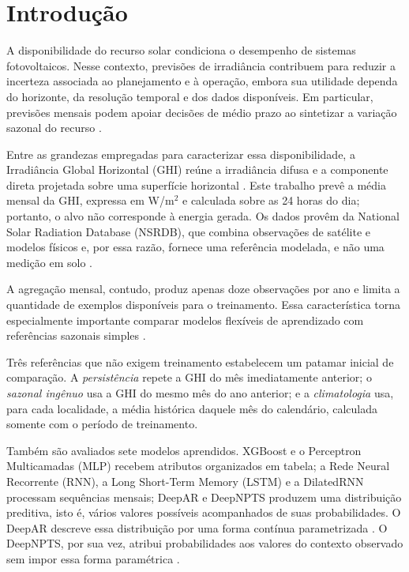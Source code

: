 \documentclass[12pt,a4paper,fleqn]{article}
\begin{document}
\section{Introdução}
\label{sec:introducao}

A disponibilidade do recurso solar condiciona o desempenho de sistemas fotovoltaicos. Nesse contexto, previsões de irradiância contribuem para reduzir a incerteza associada ao planejamento e à operação, embora sua utilidade dependa do horizonte, da resolução temporal e dos dados disponíveis. Em particular, previsões mensais podem apoiar decisões de médio prazo ao sintetizar a variação sazonal do recurso \citep{antonanzas2016,voyant2017}.

Entre as grandezas empregadas para caracterizar essa disponibilidade, a Irradiância Global Horizontal (GHI) reúne a irradiância difusa e a componente direta projetada sobre uma superfície horizontal \citep{duffie2013}. Este trabalho prevê a média mensal da GHI, expressa em W/m$^2$ e calculada sobre as 24 horas do dia; portanto, o alvo não corresponde à energia gerada. Os dados provêm da National Solar Radiation Database (NSRDB), que combina observações de satélite e modelos físicos e, por essa razão, fornece uma referência modelada, e não uma medição em solo \citep{sengupta2018}.

A agregação mensal, contudo, produz apenas doze observações por ano e limita a quantidade de exemplos disponíveis para o treinamento. Essa característica torna especialmente importante comparar modelos flexíveis de aprendizado com referências sazonais simples \citep{voyant2017,voyant2022}.

Três referências que não exigem treinamento estabelecem um patamar inicial de comparação. A \textit{persistência} repete a GHI do mês imediatamente anterior; o \textit{sazonal ingênuo} usa a GHI do mesmo mês do ano anterior; e a \textit{climatologia} usa, para cada localidade, a média histórica daquele mês do calendário, calculada somente com o período de treinamento.

Também são avaliados sete modelos aprendidos. XGBoost e o Perceptron Multicamadas (MLP) recebem atributos organizados em tabela; a Rede Neural Recorrente (RNN), a Long Short-Term Memory (LSTM) e a DilatedRNN processam sequências mensais; DeepAR e DeepNPTS produzem uma distribuição preditiva, isto é, vários valores possíveis acompanhados de suas probabilidades. O DeepAR descreve essa distribuição por uma forma contínua parametrizada \citep{salinas2020}. O DeepNPTS, por sua vez, atribui probabilidades aos valores do contexto observado sem impor essa forma paramétrica \citep{rangapuram2023}.
\end{document}

